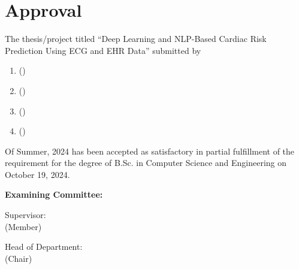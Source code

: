 \section*{Approval}

The thesis/project titled “Deep Learning and NLP-Based Cardiac Risk Prediction Using ECG and EHR Data” submitted by 
\begin{enumerate}
\color{\studentonecolor}
  \item \studentonename (\studentoneid)
  \color{\studenttwocolor}
  \item \studenttwoname (\studenttwoid)
  \color{\studentthreecolor}
  \item \studentthreename (\studentthreeid)
  \color{\studentfourcolor}
  \item \studentfourname (\studentfourid)
   \color{black}
\end{enumerate}

Of Summer, 2024 has been accepted as satisfactory in partial fulfillment of the requirement for the degree of B.Sc. in Computer Science and Engineering on October 19, 2024. 

\vspace{0.5cm}
\textbf{Examining Committee:}

\vspace{1cm}

Supervisor:\\
(Member)
\begin{center}
    \hspace{7cm}  \hspace{1cm} 
\end{center}


Head of Department:\\
(Chair)
\begin{center}
    \hspace{7cm}  \hspace{1cm} 
\end{center}

\pagebreak